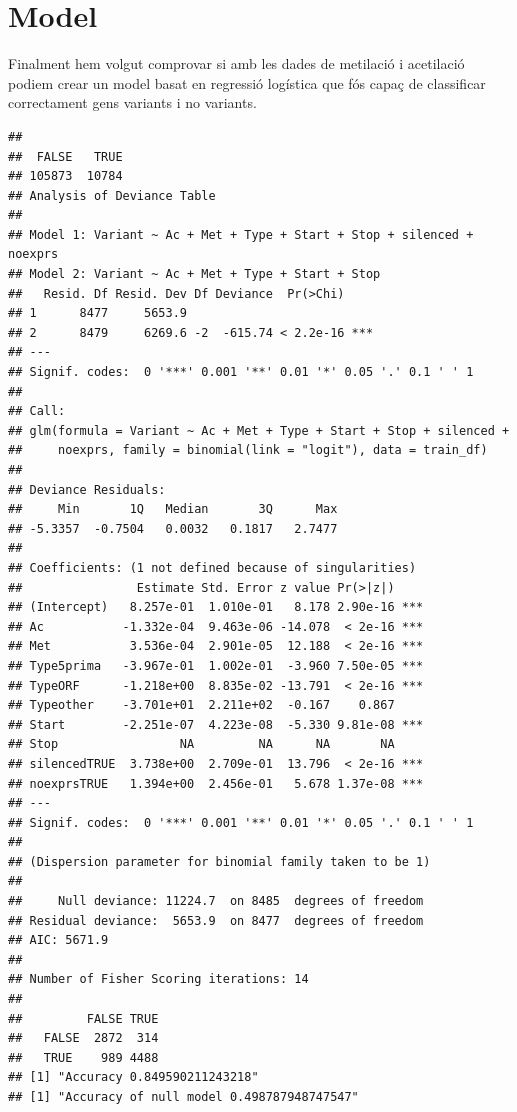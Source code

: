 \documentclass{article}\usepackage[]{graphicx}\usepackage[]{color}
\makeatletter
\newenvironment{kframe}{%
 \def\at@end@of@kframe{}%
 \ifinner\ifhmode%
  \def\at@end@of@kframe{\end{minipage}}%
  \begin{minipage}{\columnwidth}%
 \fi\fi%
 \def\FrameCommand##1{\hskip\@totalleftmargin \hskip-\fboxsep
 \colorbox{shadecolor}{##1}\hskip-\fboxsep
     \hskip-\linewidth \hskip-\@totalleftmargin \hskip\columnwidth}%
 \MakeFramed {\advance\hsize-\width
   \@totalleftmargin\z@ \linewidth\hsize
   \@setminipage}}%
 {\par\unskip\endMakeFramed%
 \at@end@of@kframe}
\newenvironment{knitrout}{}{} %
\makeatother
\begin{document}
\section{Model}
Finalment hem volgut comprovar si amb les dades de metilació i acetilació podiem crear un model basat en regressió logística que fós capaç de classificar correctament gens variants i no variants.
\begin{knitrout}
\color{fgcolor}\begin{kframe}
\begin{verbatim}
## 
##  FALSE   TRUE 
## 105873  10784
## Analysis of Deviance Table
## 
## Model 1: Variant ~ Ac + Met + Type + Start + Stop + silenced + noexprs
## Model 2: Variant ~ Ac + Met + Type + Start + Stop
##   Resid. Df Resid. Dev Df Deviance  Pr(>Chi)    
## 1      8477     5653.9                          
## 2      8479     6269.6 -2  -615.74 < 2.2e-16 ***
## ---
## Signif. codes:  0 '***' 0.001 '**' 0.01 '*' 0.05 '.' 0.1 ' ' 1
## 
## Call:
## glm(formula = Variant ~ Ac + Met + Type + Start + Stop + silenced + 
##     noexprs, family = binomial(link = "logit"), data = train_df)
## 
## Deviance Residuals: 
##     Min       1Q   Median       3Q      Max  
## -5.3357  -0.7504   0.0032   0.1817   2.7477  
## 
## Coefficients: (1 not defined because of singularities)
##                Estimate Std. Error z value Pr(>|z|)    
## (Intercept)   8.257e-01  1.010e-01   8.178 2.90e-16 ***
## Ac           -1.332e-04  9.463e-06 -14.078  < 2e-16 ***
## Met           3.536e-04  2.901e-05  12.188  < 2e-16 ***
## Type5prima   -3.967e-01  1.002e-01  -3.960 7.50e-05 ***
## TypeORF      -1.218e+00  8.835e-02 -13.791  < 2e-16 ***
## Typeother    -3.701e+01  2.211e+02  -0.167    0.867    
## Start        -2.251e-07  4.223e-08  -5.330 9.81e-08 ***
## Stop                 NA         NA      NA       NA    
## silencedTRUE  3.738e+00  2.709e-01  13.796  < 2e-16 ***
## noexprsTRUE   1.394e+00  2.456e-01   5.678 1.37e-08 ***
## ---
## Signif. codes:  0 '***' 0.001 '**' 0.01 '*' 0.05 '.' 0.1 ' ' 1
## 
## (Dispersion parameter for binomial family taken to be 1)
## 
##     Null deviance: 11224.7  on 8485  degrees of freedom
## Residual deviance:  5653.9  on 8477  degrees of freedom
## AIC: 5671.9
## 
## Number of Fisher Scoring iterations: 14
##        
##         FALSE TRUE
##   FALSE  2872  314
##   TRUE    989 4488
## [1] "Accuracy 0.849590211243218"
## [1] "Accuracy of null model 0.498787948747547"
\end{verbatim}



\end{kframe}
\end{knitrout}
\end{document}

